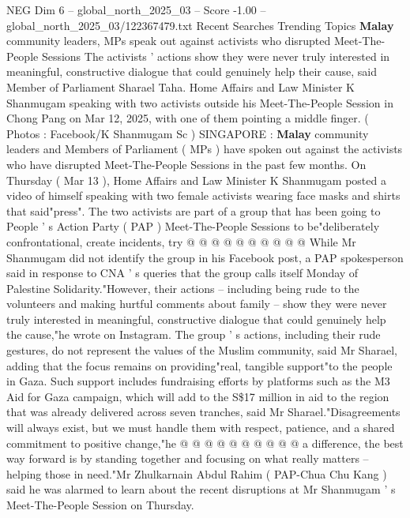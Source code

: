 \begin{textsample}{NEG Dim 6 – global\_north\_2025\_03 – Score -1.00 – global\_north\_2025\_03/122367479.txt}  \label{ex:f6_neg_233}
Recent Searches Trending Topics \textbf{Malay} community leaders, MPs speak out against activists who disrupted Meet-The-People Sessions The activists ' actions show they were never truly interested in meaningful, constructive dialogue that could genuinely help their cause, said Member of Parliament Sharael Taha.
Home Affairs and Law Minister K Shanmugam speaking with two activists outside his Meet-The-People Session in Chong Pang on Mar 12, 2025, with one of them pointing a middle finger. ( Photos : Facebook/K Shanmugam Sc ) SINGAPORE : \textbf{Malay} community leaders and Members of Parliament ( MPs ) have spoken out against the activists who have disrupted Meet-The-People Sessions in the past few months.
On Thursday ( Mar 13 ), Home Affairs and Law Minister K Shanmugam posted a video of himself speaking with two female activists wearing face masks and shirts that said"press".
The two activists are part of a group that has been going to People ' s Action Party ( PAP ) Meet-The-People Sessions to be"deliberately confrontational, create incidents, try @ @ @ @ @ @ @ @ @ @ While Mr Shanmugam did not identify the group in his Facebook post, a PAP spokesperson said in response to CNA ' s queries that the group calls itself Monday of Palestine Solidarity."However, their actions -- including being rude to the volunteers and making hurtful comments about family -- show they were never truly interested in meaningful, constructive dialogue that could genuinely help the cause,"he wrote on Instagram.
The group ' s actions, including their rude gestures, do not represent the values of the Muslim community, said Mr Sharael, adding that the focus remains on providing"real, tangible support"to the people in Gaza.
Such support includes fundraising efforts by platforms such as the M3 Aid for Gaza campaign, which will add to the S\$17 million in aid to the region that was already delivered across seven tranches, said Mr Sharael."Disagreements will always exist, but we must handle them with respect, patience, and a shared commitment to positive change,"he @ @ @ @ @ @ @ @ @ @ a difference, the best way forward is by standing together and focusing on what really matters -- helping those in need."Mr Zhulkarnain Abdul Rahim ( PAP-Chua Chu Kang ) said he was alarmed to learn about the recent disruptions at Mr Shanmugam ' s Meet-The-People Session on Thursday.

\end{textsample}
